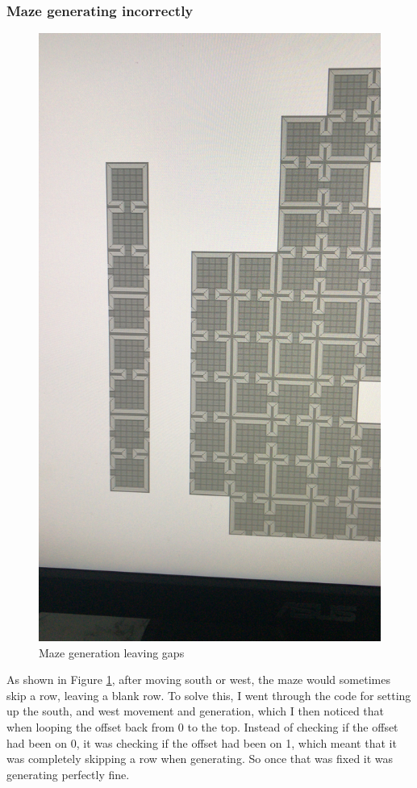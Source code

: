 \documentclass[../Main.tex]{subfiles}
\begin{document}
        \subsubsection{Maze generating incorrectly}
            \begin{figure}[hbt!]
                \centerline{\includegraphics[scale=0.1]{img/Testing/General/Maze Gen Issue.jpg}}
                \caption{Maze generation leaving gaps}
                \label{fig:MazeGenIssue}
            \end{figure}
            As shown in Figure \ref{fig:MazeGenIssue}, after moving south or west, the maze would sometimes skip a row, leaving a blank row. To solve this, I went through the code for setting up the south, and west movement and generation, which I then noticed that when looping the offset back from 0 to the top. Instead of checking if the offset had been on 0, it was checking if the offset had been on 1, which meant that it was completely skipping a row when generating. So once that was fixed it was generating perfectly fine.
\end{document}
